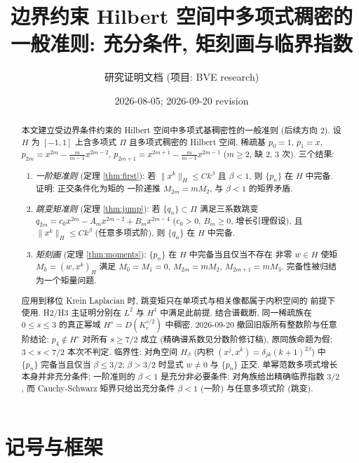 \documentclass[UTF8]{ctexart}
\title{边界约束 Hilbert 空间中多项式稠密的一般准则: 充分条件, 矩刻画与临界指数}
\author{研究证明文档 (项目: BVE research)}
\date{2026-08-05; 2026-09-20 revision}
\begin{document}
\maketitle

\begin{abstract}
本文建立受边界条件约束的 Hilbert 空间中多项式基稠密性的一般准则 (后续方向 2).
设 $H$ 为 $[-1,1]$ 上含多项式 $\Pi$ 且多项式稠密的 Hilbert 空间, 稀疏基
$p_0 = 1$, $p_1 = x$, $p_{2m} = x^{2m} - \frac{m}{m-1}x^{2m-2}$,
$p_{2m+1} = x^{2m+1} - \frac{m}{m-1}x^{2m-1}$ ($m \geq 2$, 缺 2, 3 次). 三个结果:
\begin{enumerate}
	\item \emph{一阶矩准则} (定理 \ref{thm:first}): 若 $\|x^k\|_H \leq C k^\beta$ 且
		$\beta < 1$, 则 $\{p_n\}$ 在 $H$ 中完备. 证明: 正交条件化为矩的
		一阶递推 $M_{2m} = mM_2$, 与 $\beta < 1$ 的矩界矛盾.
	\item \emph{跳变矩准则} (定理 \ref{thm:jump}): 若 $\{q_n\} \subset \Pi$ 满足三系数跳变
		$q_{2m} = c_0 x^{2m} - A_m x^{2m-2} + B_m x^{2m-4}$ ($c_0 > 0$,
		$B_m \geq 0$, 增长引理假设), 且 $\|x^k\|_H \leq Ck^\beta$ (任意多项式阶),
		则 $\{q_n\}$ 在 $H$ 中完备.
	\item \emph{矩刻画} (定理 \ref{thm:moments}): $\{p_n\}$ 在 $H$ 中完备当且仅当不存在
		非零 $w \in H$ 使矩 $M_k = (w, x^k)_H$ 满足 $M_0 = M_1 = 0$,
		$M_{2m} = mM_2$, $M_{2m+1} = mM_3$. 完备性被归结为一个矩量问题.
\end{enumerate}
应用到移位 Krein Laplacian 时, 跳变矩只在单项式与相关像都属于内积空间的
前提下使用. H2/H3 主证明分别在 $L^2$ 与 $H^1$ 中满足此前提.
结合谱截断, 同一稀疏族在 $0\le s\le3$ 的真正幂域 $H^s=D(K_c^{s/2})$
中稠密. 2026-09-20 撤回旧版所有整数阶与任意阶结论:
$p_4\notin H^s$ 对所有 $s\ge7/2$ 成立 (精确谱系数见分数阶修订稿), 原同族命题为假; $3<s<7/2$ 本次不判定.
临界性: 对角空间
$H_\beta$ (内积 $(x^j, x^k) = \delta_{jk}(k+1)^{2\beta}$) 中 $\{p_n\}$
完备当且仅当 $\beta \leq 3/2$; $\beta > 3/2$ 时显式 $w \neq 0$ 与
$\{p_n\}$ 正交. 单幂范数多项式增长本身并非充分条件; 一阶准则的 $\beta<1$ 是充分非必要条件:
对角族给出精确临界指数 $3/2$, 而 Cauchy-Schwarz 矩界只给出充分条件
$\beta < 1$ (一阶) 与任意多项式阶 (跳变).
\end{abstract}

\tableofcontents

\section{记号与框架}
\end{document}
